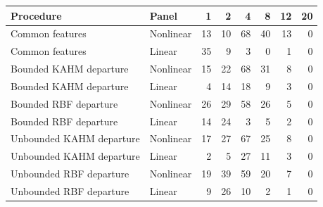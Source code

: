 \begin{tabular}{@{}llrrrrrr@{}}
\toprule
Procedure & Panel & 1 & 2 & 4 & 8 & 12 & 20 \\
\midrule
Common features & Nonlinear & 13 & 10 & 68 & 40 & 13 & 0 \\
Common features & Linear & 35 & 9 & 3 & 0 & 1 & 0 \\
Bounded KAHM departure & Nonlinear & 15 & 22 & 68 & 31 & 8 & 0 \\
Bounded KAHM departure & Linear & 4 & 14 & 18 & 9 & 3 & 0 \\
Bounded RBF departure & Nonlinear & 26 & 29 & 58 & 26 & 5 & 0 \\
Bounded RBF departure & Linear & 14 & 24 & 3 & 5 & 2 & 0 \\
Unbounded KAHM departure & Nonlinear & 17 & 27 & 67 & 25 & 8 & 0 \\
Unbounded KAHM departure & Linear & 2 & 5 & 27 & 11 & 3 & 0 \\
Unbounded RBF departure & Nonlinear & 19 & 39 & 59 & 20 & 7 & 0 \\
Unbounded RBF departure & Linear & 9 & 26 & 10 & 2 & 1 & 0 \\
\bottomrule
\end{tabular}
